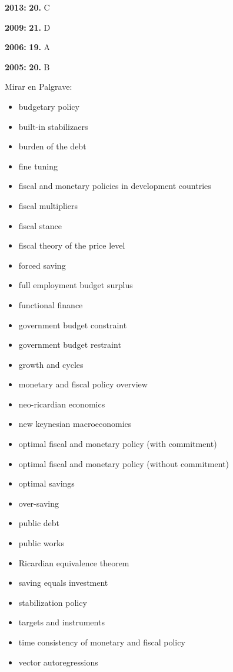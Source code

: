 \documentclass{nuevotema}
\begin{document}
\textbf{2013:} \textbf{20.} C

\textbf{2009:} \textbf{21.} D

\textbf{2006:} \textbf{19.} A

\textbf{2005:} \textbf{20.} B

\bibliografia

Mirar en Palgrave:

\begin{itemize}
	\item budgetary policy
	\item built-in stabilizaers
	\item burden of the debt
	\item fine tuning
	\item fiscal and monetary policies in development countries
	\item fiscal multipliers
	\item fiscal stance
	\item fiscal theory of the price level
	\item forced saving
	\item full employment budget surplus
	\item functional finance
	\item government budget constraint
	\item government budget restraint
	\item growth and cycles
	\item monetary and fiscal policy overview
	\item neo-ricardian economics
	\item new keynesian macroeconomics
	\item optimal fiscal and monetary policy (with commitment)
	\item optimal fiscal and monetary policy (without commitment)
	\item optimal savings
	\item over-saving
	\item public debt
	\item public works
	\item Ricardian equivalence theorem
	\item saving equals investment
	\item stabilization policy
	\item targets and instruments
	\item time consistency of monetary and fiscal policy
	\item vector autoregressions
\end{itemize}
\end{document}
